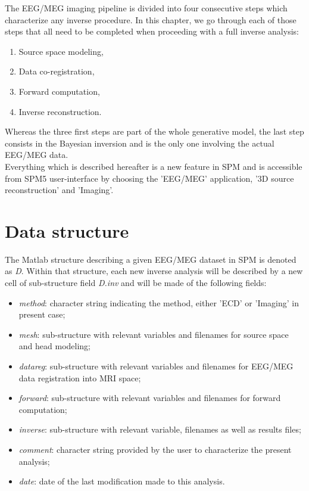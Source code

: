The EEG/MEG imaging pipeline is divided into four consecutive steps which characterize any inverse procedure. In this chapter, we go through each of those steps that all need to be completed when proceeding with a full inverse analysis:
\begin{enumerate}
    \item Source space modeling,
    \item Data co-registration,
    \item Forward computation,
    \item Inverse reconstruction.
\end{enumerate}

Whereas the three first steps are part of the whole generative model, the last step consists in the Bayesian inversion and is the only one involving the actual EEG/MEG data.\\

Everything which is described hereafter is a new feature in SPM and is accessible from SPM5 user-interface by choosing the 'EEG/MEG' application, '3D source reconstruction' and 'Imaging'.

\section{Data structure}
\label{sec:datastruct}
The Matlab structure describing a given EEG/MEG dataset in SPM is denoted as \textit{D}. Within that structure, each new inverse analysis will be described by a new cell of sub-structure field \textit{D.inv} and will be made of the following fields:

\begin{itemize}
    \item \textit{method}: character string indicating the method, either 'ECD' or 'Imaging' in present case;
    \item \textit{mesh}: sub-structure with relevant variables and filenames for source space and head modeling;
    \item \textit{datareg}: sub-structure with relevant variables and filenames for EEG/MEG data registration into MRI space;
    \item \textit{forward}: sub-structure with relevant variables and filenames for forward computation;
    \item \textit{inverse}: sub-structure with relevant variable, filenames as well as results files;
    \item \textit{comment}: character string provided by the user to characterize the present analysis;
    \item \textit{date}: date of the last modification made to this analysis.
\end{itemize}


